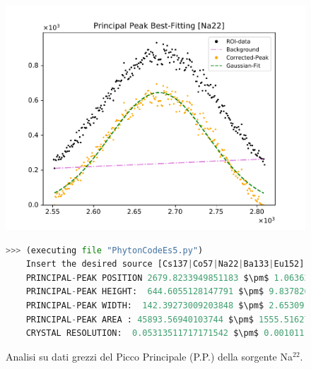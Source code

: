\begin{figure}[h!]
	\centering
	\caption{Analisi su dati grezzi del Picco Principale (P.P.) della sorgente Na$^{22}$. }
	\includegraphics[width =  \textwidth,trim={1cm 0 1cm 0}, clip]{Immagini/Peak-Fitting_Na22_RAW.pdf}
	\label{fig:PPRawNa22} \bigskip\bigskip
	\begin{lstlisting}[language=python, style=Pystyle, mathescape=true]
	>>> (executing file "PhytonCodeEs5.py")
	Insert the desired source [Cs137|Co57|Na22|Ba133|Eu152]: Na22
	PRINCIPAL-PEAK POSITION 2679.8233949851183 $\pm$ 1.0636289671764676
	PRINCIPAL-PEAK HEIGHT:  644.6055128147791 $\pm$ 9.837826754288718
	PRINCIPAL-PEAK WIDTH:  142.39273009203848 $\pm$ 2.6530917116409816
	PRINCIPAL-PEAK AREA : 45893.56940103744 $\pm$ 1555.5162765213215
	CRYSTAL RESOLUTION:  0.05313511717171542 $\pm$ 0.0010111143019759258
	\end{lstlisting} \bigskip\bigskip
\end{figure}

\newpage

